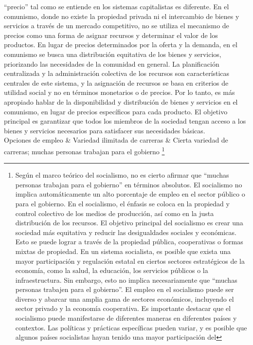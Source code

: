 \documentclass[
  man,
  floatsintext,
  longtable,
  a4paper,
  nolmodern,
  notxfonts,
  notimes,
  colorlinks=true,linkcolor=blue,citecolor=blue,urlcolor=blue]{apa7}
\begin{document}
\begin{longtable}[]
{  ``precio'' tal como se entiende en los sistemas capitalistas es
  diferente. En el comunismo, donde no existe la propiedad privada ni el
  intercambio de bienes y servicios a través de un mercado competitivo,
  no se utiliza el mecanismo de precios como una forma de asignar
  recursos y determinar el valor de los productos. En lugar de precios
  determinados por la oferta y la demanda, en el comunismo se busca una
  distribución equitativa de los bienes y servicios, priorizando las
  necesidades de la comunidad en general. La planificación centralizada
  y la administración colectiva de los recursos son características
  centrales de este sistema, y la asignación de recursos se basa en
  criterios de utilidad social y no en términos monetarios o de precios.
  Por lo tanto, es más apropiado hablar de la disponibilidad y
  distribución de bienes y servicios en el comunismo, en lugar de
  precios específicos para cada producto. El objetivo principal es
  garantizar que todos los miembros de la sociedad tengan acceso a los
  bienes y servicios necesarios para satisfacer sus necesidades básicas.} \\
Opciones de empleo & Variedad ilimitada de carreras & Cierta variedad de
carreras; muchas personas trabajan para el gobierno \footnote{Según el
  marco teórico del socialismo, no es cierto afirmar que ``muchas
  personas trabajan para el gobierno'' en términos absolutos. El
  socialismo no implica automáticamente un alto porcentaje de empleo en
  el sector público o para el gobierno. En el socialismo, el énfasis se
  coloca en la propiedad y control colectivo de los medios de
  producción, así como en la justa distribución de los recursos. El
  objetivo principal del socialismo es crear una sociedad más equitativa
  y reducir las desigualdades sociales y económicas. Esto se puede
  lograr a través de la propiedad pública, cooperativas o formas mixtas
  de propiedad. En un sistema socialista, es posible que exista una
  mayor participación y regulación estatal en ciertos sectores
  estratégicos de la economía, como la salud, la educación, los
  servicios públicos o la infraestructura. Sin embargo, esto no implica
  necesariamente que ``muchas personas trabajen para el gobierno''. El
  empleo en el socialismo puede ser diverso y abarcar una amplia gama de
  sectores económicos, incluyendo el sector privado y la economía
  cooperativa. Es importante destacar que el socialismo puede
  manifestarse de diferentes maneras en diferentes países y contextos.
  Las políticas y prácticas específicas pueden variar, y es posible que
  algunos países socialistas hayan tenido una mayor participación del
}
\end{longtable}
\end{document}
